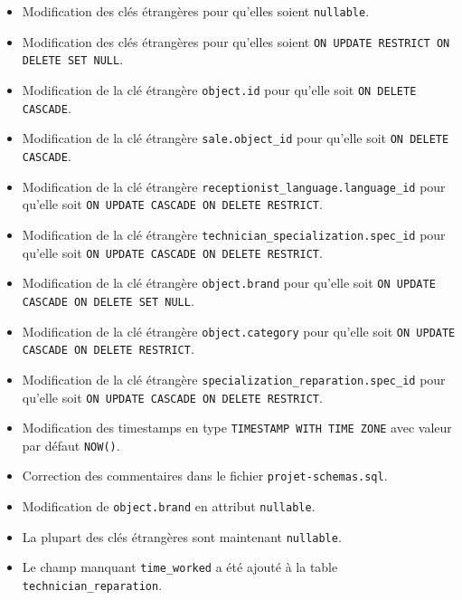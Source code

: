 \documentclass{article}
\newcommand{\ttt}{\texttt}
\begin{document}
\begin{itemize}
    \item Modification des clés étrangères pour qu'elles soient \ttt{nullable}.
    \item Modification des clés étrangères pour qu'elles soient \ttt{ON UPDATE RESTRICT ON DELETE SET NULL}.
    \item Modification de la clé étrangère \ttt{object.id} pour qu'elle soit \ttt{ON DELETE CASCADE}.
    \item Modification de la clé étrangère \ttt{sale.object\_id} pour qu'elle soit \ttt{ON DELETE CASCADE}.
    \item Modification de la clé étrangère \ttt{receptionist\_language.language\_id} pour qu'elle soit \ttt{ON UPDATE CASCADE ON DELETE RESTRICT}.
    \item Modification de la clé étrangère \ttt{technician\_specialization.spec\_id} pour qu'elle soit \ttt{ON UPDATE CASCADE ON DELETE RESTRICT}.  
    \item Modification de la clé étrangère \ttt{object.brand} pour qu'elle soit \ttt{ON UPDATE CASCADE ON DELETE SET NULL}.
    \item Modification de la clé étrangère \ttt{object.category} pour qu'elle soit \ttt{ON UPDATE CASCADE ON DELETE RESTRICT}.
    \item Modification de la clé étrangère \ttt{specialization\_reparation.spec\_id} pour qu'elle soit \ttt{ON UPDATE CASCADE ON DELETE RESTRICT}.
\end{itemize}

\begin{itemize}
    \item Modification des timestamps en type \ttt{TIMESTAMP WITH TIME ZONE} avec valeur par défaut \ttt{NOW()}.
    \item Correction des commentaires dans le fichier \ttt{projet-schemas.sql}.
    \item Modification de \ttt{object.brand} en attribut \ttt{nullable}.
    \item La plupart des clés étrangères sont maintenant \ttt{nullable}.
    \item Le champ manquant \ttt{time\_worked} a été ajouté à la table \ttt{technician\_reparation}.
\end{itemize}
\end{document}
